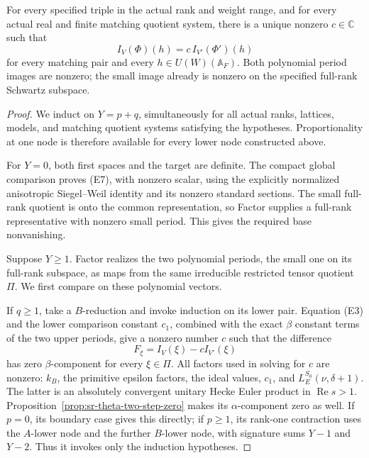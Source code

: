 \begin{srtheorem}
\label{thm:sr-theta-actual-proportionality}
For every specified triple in the actual rank and weight range,
and for every actual real and finite matching quotient system,
there is a unique nonzero \(c\in\mathbb C\) such that
\[
            I_V(\Phi)(h)=c\,I_{V'}(\Phi')(h)
 \tag{E7}\label{eq:sr-theta-actual-proportionality}
\]
for every matching pair and every \(h\in U(W)(\mathbb A_F)\).
Both polynomial period images are nonzero; the small image
already is nonzero on the specified full-rank Schwartz subspace.
\end{srtheorem}

\begin{proof}
We induct on \(Y=p+q\), simultaneously for all actual ranks,
lattices, models, and matching quotient systems satisfying
the hypotheses. Proportionality at one node is therefore
available for every lower node constructed above.

For \(Y=0\), both first spaces and the target are definite.
The compact global comparison proves (E7), with nonzero scalar,
using the explicitly normalized anisotropic Siegel--Weil
identity and its nonzero standard sections.
The small full-rank quotient is onto the common representation,
so Factor supplies a full-rank representative with nonzero
small period. This gives the required base nonvanishing.

Suppose \(Y\ge1\). Factor realizes the two polynomial periods,
the small one on its full-rank subspace, as maps from the
same irreducible restricted tensor quotient \(\Pi\).
We first compare on these polynomial vectors.

If \(q\ge1\), take a \(B\)-reduction and invoke induction
on its lower pair. Equation (E3) and the lower comparison
constant \(c_1\), combined with the exact \(\beta\) constant
terms of the two upper periods, give a nonzero number \(c\)
such that the difference
\[
                  F_\xi=I_V(\xi)-cI_{V'}(\xi)
\]
has zero \(\beta\)-component for every \(\xi\in\Pi\).
All factors used in solving for \(c\) are nonzero:
\(k_B\), the primitive epsilon factors, the ideal values,
\(c_1\), and \(L_E^{S_0}(\nu,\delta+1)\).
The latter is an absolutely convergent unitary Hecke Euler
product in \(\operatorname{Re}s>1\).
Proposition~\ref{prop:sr-theta-two-step-zero} makes its
\(\alpha\)-component zero as well. If \(p=0\), its boundary
case gives this directly; if \(p\ge1\), its rank-one
contraction uses the \(A\)-lower node and the further
\(B\)-lower node, with signature sums \(Y-1\) and \(Y-2\).
Thus it invokes only the induction hypotheses.


\end{proof}

